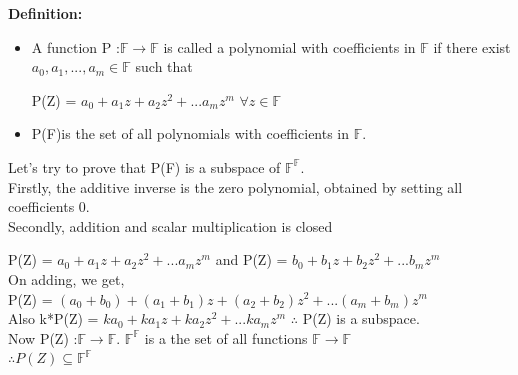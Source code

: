\documentclass{article}
\begin{document}
\begin{figure}[ht]
\centering

\begin{subfigure}{0.48\textwidth}
    \centering

\end{subfigure}
\hfill
\begin{subfigure}{0.48\textwidth}
    \centering

\end{subfigure}

\label{fig:twodiagrams}

\end{figure}
\textbf{Definition:} 
    \begin{itemize}
        \item A function P :$\mathbb{F} \rightarrow \mathbb{F}$ is called a polynomial with coefficients in $\mathbb{F}$ if there exist $a_0,a_1,...,a_m \in \mathbb{F}$ such that 
        \begin{center}
            P(Z) = $a_0 + a_1z+a_2z^2+...a_mz^m$ $\forall z \in \mathbb{F}$
        \end{center}
        \item P(F)is the set of all polynomials with coefficients in $\mathbb{F}$.
    \end{itemize}
Let's try to prove that P(F) is a subspace of $\mathbb{F}^{\mathbb{F}}$. \\
Firstly, the additive inverse is the zero polynomial, obtained by setting all coefficients 0. \\
Secondly, addition and scalar multiplication is closed 
\begin{center}
    P(Z) = $a_0 + a_1z+a_2z^2+...a_mz^m$ and P(Z) = $b_0 + b_1z+b_2z^2+...b_mz^m$ \\
    On adding, we get, \\
    P(Z) = $(a_0+b_0) + (a_1+b_1)z+(a_2+b_2)z^2+...(a_m+b_m)z^m$ \\
    Also k*P(Z) = $ka_0 + ka_1z+ka_2z^2+...ka_mz^m$
    $\therefore$ P(Z) is a subspace. \\
    Now P(Z) :$\mathbb{F} \rightarrow \mathbb{F}$. $\mathbb{F}^{\mathbb{F}}$ is a the set of all functions $\mathbb{F} \rightarrow \mathbb{F}$  \\
    $\therefore P(Z) \subseteq \mathbb{F}^{\mathbb{F}}$
\end{center}
\end{document}
